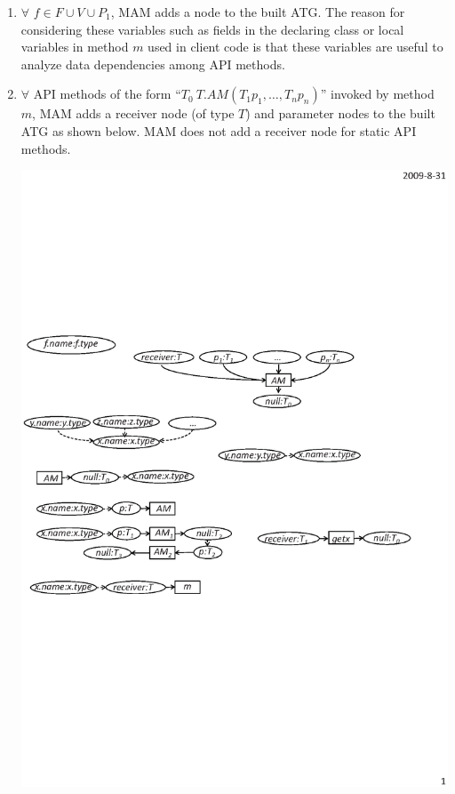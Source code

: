 \begin{enumerate}\vspace*{-2ex}
\item $\forall$ $f \in F \cup V \cup P_1$, MAM adds a node to the built ATG.
The reason for considering these variables such as fields in
the declaring class or local variables in method $m$ used in client code
is that these variables are useful to analyze data dependencies
among API methods.\vspace*{-2ex}
\item $\forall$ API methods of the form ``$T_0\ T.AM (T_1 p_1, \ldots, T_n p_n)$''
invoked by method $m$, MAM adds a receiver node (of type $T$) and
parameter nodes to the built ATG as shown below. MAM does
not add a receiver node for static API methods. \vspace*{-2ex}

\begin{center}
\includegraphics[scale=0.7,clip]{figure/rule2.eps}%
\end{center}\vspace*{-3ex}


\end{enumerate}
